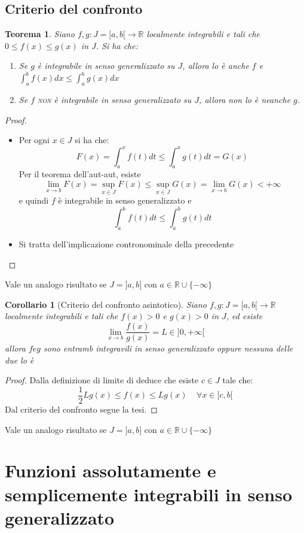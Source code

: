 \documentclass[a4paper; 11pt oneside]{book}
\theoremstyle{break}
\newtheorem{teo}{Teorema}[chapter]
\newtheorem{cor}{Corollario}[teo]
\theoremstyle{peresempio}
\begin{document}
    \subsection{Criterio del confronto}
    \begin{teo}
    Siano $f,g: J=[a,b[\to\mathbb{R}$ localmente integrabili e tali che $0\leq f(x)\leq g(x)$ in $J$. Si ha che:
    \begin{enumerate}
    \item Se $g$ è integrabile in senso generalizzato su $J$, allora lo è anche $f$ e $\int_a^b f(x)dx\leq\int_a^b g(x)dx$
    \item Se $f$ \textsc{non} è integrabile in senso generalizzato su $J$, allora non lo è neanche $g$.
    \end{enumerate}

    \end{teo}
    \begin{proof}
    \begin{itemize}
    \item Per ogni $x\in J$ si ha che:
    $$
    F(x)=\int_a^x f(t)dt\leq\int_a^x g(t)dt=G(x)
    $$
    Per il teorema dell'aut-aut, esiste
    $$
    \lim_{x\to b}F(x)=\sup_{x\in J} F(x)\leq\sup_{x\in J} G(x)=\lim_{x\to b}G(x)<+\infty
    $$
    e quindi $f$ è integrabile in senso generalizzato e 
    $$
    \int_a^b f(t)dt\leq\int_a^b g(t)dt
    $$
    \item Si tratta dell'implicazione contronominale della precedente
    \end{itemize}
    \end{proof}
    Vale un analogo risultato se $J=]a,b]$ con $a\in\mathbb{R}\cup\{-\infty\}$
    \begin{cor}[Criterio del confronto asintotico]
    Siano $f,g: J=[a,b[\to\mathbb{R}$ localmente integrabili e tali che $f(x)>0$ e $g(x)>0$ in $J$, ed esiste
    $$
    \lim_{x\to b} \frac{f(x)}{g(x)}=L\in ]0,+\infty[
    $$
    allora $f e g$ sono entramb integravili in senso generalizzato oppure nessuna delle due lo è
    \end{cor}
    \begin{proof}
    Dalla definizione di limite di deduce che esiste $c\in J$ tale che:
    $$
    \frac{1}{2}Lg(x)\leq f(x)\leq Lg(x)\;\;\;\;\forall x\in [c,b[
    $$
    Dal criterio del confronto segue la tesi.
    \end{proof}
    Vale un analogo risultato se $J=]a,b]$ con $a\in\mathbb{R}\cup\{-\infty\}$
  
  \section{Funzioni assolutamente e semplicemente integrabili in senso generalizzato}
    
\end{document}
